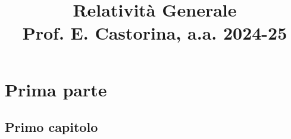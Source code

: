 \documentclass[a4paper, 12pt, openany]{book}
\title{\Huge\textbf{Relatività Generale} \\ \large Prof. E. Castorina, a.a. 2024-25}
\begin{document}
\frontmatter

\maketitle
\tableofcontents

\mainmatter

\part{Prima parte}

\chapter{Primo capitolo}
\end{document}

